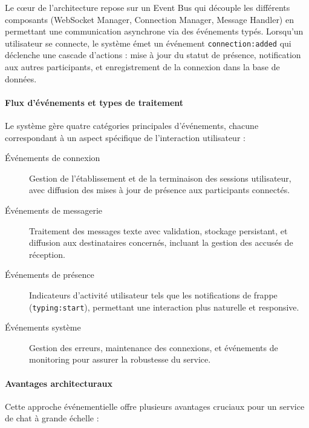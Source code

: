 \documentclass[12pt]{rapportPfe}
\begin{document}
Le cœur de l'architecture repose sur un Event Bus qui découple les différents composants (WebSocket Manager, Connection Manager, Message Handler) en permettant une communication asynchrone via des événements typés. Lorsqu'un utilisateur se connecte, le système émet un événement \texttt{connection:added} qui déclenche une cascade d'actions : mise à jour du statut de présence, notification aux autres participants, et enregistrement de la connexion dans la base de données.

\paragraph{Flux d'événements et types de traitement}

Le système gère quatre catégories principales d'événements, chacune correspondant à un aspect spécifique de l'interaction utilisateur :

\begin{description}
    \item[Événements de connexion] Gestion de l'établissement et de la terminaison des sessions utilisateur, avec diffusion des mises à jour de présence aux participants connectés.
    
    \item[Événements de messagerie] Traitement des messages texte avec validation, stockage persistant, et diffusion aux destinataires concernés, incluant la gestion des accusés de réception.
    
    \item[Événements de présence] Indicateurs d'activité utilisateur tels que les notifications de frappe (\texttt{typing:start}), permettant une interaction plus naturelle et responsive.
    
    \item[Événements système] Gestion des erreurs, maintenance des connexions, et événements de monitoring pour assurer la robustesse du service.
\end{description}

\paragraph{Avantages architecturaux}

Cette approche événementielle offre plusieurs avantages cruciaux pour un service de chat à grande échelle :
\end{document}
